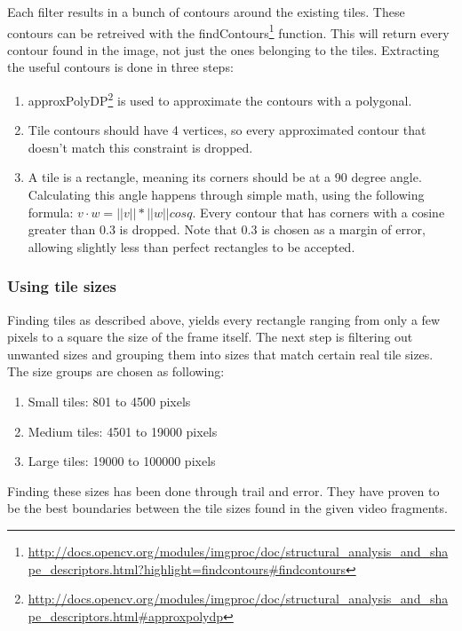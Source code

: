 \npar
Each filter results in a bunch of contours around the existing tiles. These contours can be retreived with the findContours\footnote{\url{http://docs.opencv.org/modules/imgproc/doc/structural_analysis_and_shape_descriptors.html?highlight=findcontours\#findcontours}} function. This will return every contour found in the image, not just the ones belonging to the tiles. Extracting the useful contours is done in three steps:
\begin{enumerate}
\item{approxPolyDP\footnote{\url{http://docs.opencv.org/modules/imgproc/doc/structural_analysis_and_shape_descriptors.html\#approxpolydp}} is used to approximate the contours with a polygonal.}
\item{Tile contours should have 4 vertices, so every approximated contour that doesn't match this constraint is dropped.}
\item{A tile is a rectangle, meaning its corners should be at a 90 degree angle. Calculating this angle happens through simple math, using the following formula: $v \cdot w = ||v|| * ||w|| cos q$. Every contour that has corners with a cosine greater than $0.3$ is dropped. Note that $0.3$ is chosen as a margin of error, allowing slightly less than perfect rectangles to be accepted. }
\end{enumerate}

\subsubsection{Using tile sizes}
Finding tiles as described above, yields every rectangle ranging from only a few pixels to a square the size of the frame itself. The next step is filtering out unwanted sizes and grouping them into sizes that match certain real tile sizes. The size groups are chosen as following:
\begin{enumerate}
\item{Small tiles: 801 to 4500 pixels}
\item{Medium tiles: 4501 to 19000 pixels}
\item{Large tiles: 19000 to 100000 pixels}
\end{enumerate}
Finding these sizes has been done through trail and error. They have proven to be the best boundaries between the tile sizes found in the given video fragments.
